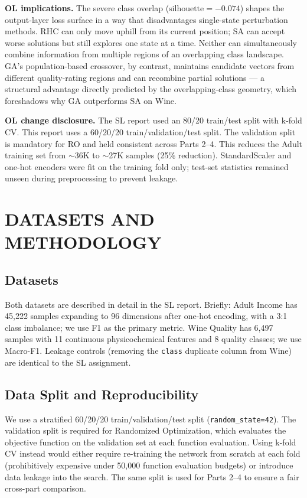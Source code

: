 \documentclass[letterpaper, 10 pt, conference]{ieeeconf}
\begin{document}
\textbf{OL implications.} The severe class overlap ($\text{silhouette} = -0.074$) shapes the output-layer loss surface in a way that disadvantages single-state perturbation methods. RHC can only move uphill from its current position; SA can accept worse solutions but still explores one state at a time. Neither can simultaneously combine information from multiple regions of an overlapping class landscape. GA's population-based crossover, by contrast, maintains candidate vectors from different quality-rating regions and can recombine partial solutions --- a structural advantage directly predicted by the overlapping-class geometry, which foreshadows why GA outperforms SA on Wine.

\textbf{OL change disclosure.} The SL report used an 80/20 train/test split with k-fold CV. This report uses a 60/20/20 train/validation/test split. The validation split is mandatory for RO and held consistent across Parts 2--4. This reduces the Adult training set from $\sim$36K to $\sim$27K samples (25\% reduction). StandardScaler and one-hot encoders were fit on the training fold only; test-set statistics remained unseen during preprocessing to prevent leakage.


\section{DATASETS AND METHODOLOGY}

\subsection{Datasets}

Both datasets are described in detail in the SL report. Briefly: Adult Income has 45{,}222 samples expanding to 96 dimensions after one-hot encoding, with a 3:1 class imbalance; we use F1 as the primary metric. Wine Quality has 6{,}497 samples with 11 continuous physicochemical features and 8 quality classes; we use Macro-F1. Leakage controls (removing the \texttt{class} duplicate column from Wine) are identical to the SL assignment.

\subsection{Data Split and Reproducibility}

We use a stratified 60/20/20 train/validation/test split (\texttt{random\_state=42}). The validation split is required for Randomized Optimization, which evaluates the objective function on the validation set at each function evaluation. Using k-fold CV instead would either require re-training the network from scratch at each fold (prohibitively expensive under 50{,}000 function evaluation budgets) or introduce data leakage into the search. The same split is used for Parts 2--4 to ensure a fair cross-part comparison.
\end{document}
